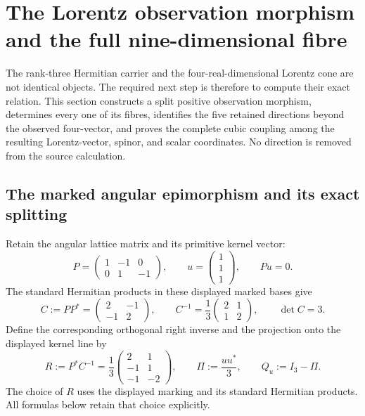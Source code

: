 \section{The Lorentz observation morphism and the full nine-dimensional fibre}
\label{hlob:sec:observation-morphism}

The rank-three Hermitian carrier and the four-real-dimensional Lorentz cone
are not identical objects.  The required next step is therefore to compute
their exact relation.  This section constructs a split positive observation
morphism, determines every one of its fibres, identifies the five retained
directions beyond the observed four-vector, and proves the complete cubic
coupling among the resulting Lorentz-vector, spinor, and scalar coordinates.
No direction is removed from the source calculation.

\subsection{The marked angular epimorphism and its exact splitting}
\label{hlob:subsec:marked-splitting}

Retain the angular lattice matrix and its primitive kernel vector:
\begin{equation}
 P=
 \begin{pmatrix}
  1&-1&0\\
  0& 1&-1
 \end{pmatrix},
 \qquad
 u=\begin{pmatrix}1\\1\\1\end{pmatrix},
 \qquad Pu=0.
 \label{hlob:eq:P-u}
\end{equation}
The standard Hermitian products in these displayed marked bases give
\begin{equation}
 C:=PP^*
 =\begin{pmatrix}2&-1\\-1&2\end{pmatrix},
 \qquad
 C^{-1}=\frac13\begin{pmatrix}2&1\\1&2\end{pmatrix},
 \qquad \det C=3.
 \label{hlob:eq:cartan}
\end{equation}
Define the corresponding orthogonal right inverse and the projection onto
the displayed kernel line by
\begin{equation}
 R:=P^*C^{-1}
 =\frac13
 \begin{pmatrix}
  2& 1\\
 -1& 1\\
 -1&-2
 \end{pmatrix},
 \qquad
 \Pi:=\frac{uu^*}{3},
 \qquad Q_u:=I_3-\Pi.
 \label{hlob:eq:R-Pi}
\end{equation}
The choice of \(R\) uses the displayed marking and its standard Hermitian
products.  All formulas below retain that choice explicitly.

